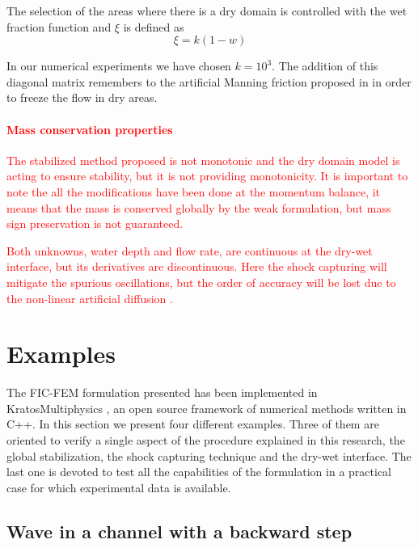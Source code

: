 \documentclass[a4paper,12pt]{elsarticle}
\newcommand{\Miguel}[1]{\textcolor{red}{#1}}
\begin{document}
The selection of the areas where there is a dry domain is controlled with the wet fraction function and $\xi$ is defined as
\begin{equation}
\xi = k(1-w)
\end{equation}

In our numerical experiments we have chosen $k=10^3$.
The addition of this diagonal matrix remembers to the artificial Manning friction proposed in \cite{heniche2000} in order to freeze the flow in dry areas.


\Miguel{%
\paragraph{Mass conservation properties}
The stabilized method proposed is not monotonic and the dry domain model is acting to ensure stability, but it is not providing monotonicity. It is important to note the all the modifications have been done at the momentum balance, it means that the mass is conserved globally by the weak formulation, but mass sign preservation is not guaranteed.
}

\Miguel{
Both unknowns, water depth and flow rate, are continuous at the dry-wet interface, but its derivatives are discontinuous. Here the shock capturing will mitigate the spurious oscillations, but the order of accuracy will be lost due to the non-linear artificial diffusion \cite{badia2014}. 
}


\section{Examples}
\label{sec:examples}

The FIC-FEM formulation presented has been implemented in KratosMultiphysics \cite{dadvand2010, dadvand2013}, an open source framework of numerical methods written in C++.
In this section we present four different examples. Three of them are oriented to verify a single aspect of the procedure explained in this research, the global stabilization, the shock capturing technique and the dry-wet interface.
The last one is devoted to test all the capabilities of the formulation in a practical case for which experimental data is available.


\subsection{Wave in a channel with a backward step}
\end{document}
